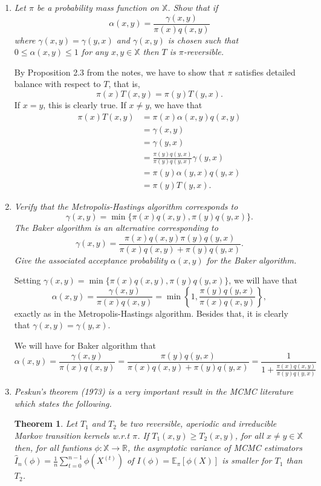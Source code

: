 \documentclass[a4paper,12pt]{article}
\newcommand{\R}{\mathbb{R}}
\newcommand{\ev}{\mathbb{E}}
\newtheorem*{theorem}{Theorem}
\theoremstyle{definition}
\begin{document}
\begin{enumerate}
    \item {\it Let $\pi$ be a probability mass function on $\mathbb{X}$. Show
    that if $$\alpha(x, y) = \frac{\gamma(x,y)}{\pi(x)q(x,y)}$$
    where $\gamma(x, y) = \gamma(y, x)$ and $\gamma(x, y)$ is chosen such that
    $0 \le \alpha (x, y) \le 1$ for any $x, y \in \mathbb{X}$ then $T$ is
    $\pi$-reversible.}

    By Proposition 2.3 from the notes, we have to show that 
    $\pi$ satisfies detailed balance with respect to $T$,
    that is, 
    $$
    \pi(x)T(x,y) = \pi(y)T(y,x).
    $$
    If $x = y$, this is clearly true. If $x \neq y$, we have that 
    \begin{equation*}
        \begin{split}
            \pi(x)T(x,y) &= \pi(x)\alpha(x,y)q(x,y) \\
            &= \gamma(x,y) \\ 
            &= \gamma(y,x) \\
            &= \frac{\pi(y)q(y,x)}{\pi(y)q(y,x)}\gamma(y,x) \\
            &= \pi(y)\alpha(y,x)q(y,x) \\
            &= \pi(y)T(y,x).
        \end{split}
    \end{equation*}

    \item {\it Verify that the Metropolis-Hastings algorithm corresponds to
    $$\gamma(x, y) = \min\{\pi(x) q (x, y), \pi (y) q (y, x)\}.$$     The Baker
    algorithm is an alternative corresponding to}
    $$\gamma(x,y) =
    \frac{\pi(x)q(x,y)\pi(y)q(y,x)}{\pi(x)q(x,y)+\pi(y)q(y,x)}.$$
    {\it Give the associated acceptance probability $\alpha(x, y)$ for the
    Baker algorithm.}
    
    Setting $\gamma(x,y) = \min\{\pi(x)q(x,y), \pi(y)q(y,x)\}$, we will 
    have that 
    $$
    \alpha(x,y) = \frac{\gamma(x,y)}{\pi(x)q(x,y)} = \min\left\{1, 
    \frac{\pi(y)q(y,x)}{\pi(x)q(x,y)}\right\},
    $$
    exactly as in the Metropolis-Hastings algorithm. Besides that, 
    it is clearly that $\gamma(x,y) = \gamma(y,x)$. 

    We will have for Baker algorithm that
    $$\alpha(x, y) = \frac{\gamma(x,y)}{\pi(x)q(x,y)} =
    \frac{\pi(y)q(y,x)}{\pi(x)q(x,y)+\pi(y)q(y,x)} = \frac{1}{1 + \frac{\pi(x)q(x,y)}{\pi(y)q(y,x)}}$$
    
    \item {\it Peskun’s theorem (1973) is a very important result in the MCMC literature which states the following.}
    \begin{theorem}
        Let $T_1$ and $T_2$ be two reversible, aperiodic and irreducible Markov transition kernels w.r.t
        $\pi$. If $T_1(x,y) \ge T_2(x,y)$, for all $x \neq y \in \mathbb{X}$
        then, for all funtions $\phi : \mathbb{X} \to \R$, the asymptotic
        variance of MCMC estimators $\hat{I}_n(\phi) =
        \frac{1}{n}\sum_{t=0}^{n-1} \phi(X^{(t)})$ of $I(\phi) =
        \ev_{\pi}[\phi(X)]$ is smaller for $T_1$ than $T_2$. 
    \end{theorem}


\end{enumerate}
\end{document}
